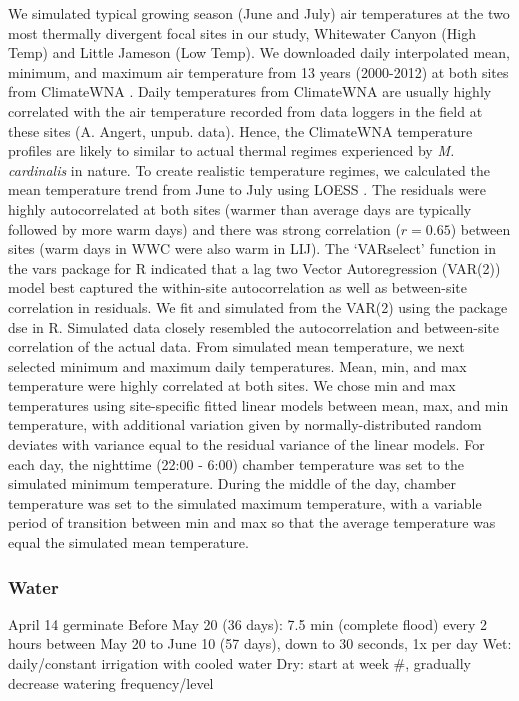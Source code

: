 \documentclass[11pt, oneside]{article}\usepackage[]{graphicx}\usepackage[]{color}
\newcommand{\pkg}[1]{{\fontseries{b}\selectfont #1}}
\begin{document}
We simulated typical growing season (June and July) air temperatures at the two most thermally divergent focal sites in our study, Whitewater Canyon (High Temp) and Little Jameson (Low Temp). We downloaded daily interpolated mean, minimum, and maximum air temperature from 13 years (2000-2012) at both sites from ClimateWNA \citep{Wang_etal_2012}. Daily temperatures from ClimateWNA are usually highly correlated with the air temperature recorded from data loggers in the field at these sites (A. Angert, unpub. data). Hence, the ClimateWNA temperature profiles are likely to similar to actual thermal regimes experienced by \textit{M. cardinalis} in nature. To create realistic temperature regimes, we calculated the mean temperature trend from June to July using LOESS \citep{Cleveland_etal_1992}. The residuals were highly autocorrelated at both sites (warmer than average days are typically followed by more warm days) and there was strong correlation ($r = 0.65$) between sites (warm days in WWC were also warm in LIJ). The `VARselect' function in the \pkg{vars} package for R \citep{Pfaff_2008} indicated that a lag two Vector Autoregression (VAR(2)) model best captured the within-site autocorrelation as well as between-site correlation in residuals. We fit and simulated from the VAR(2) using the package \pkg{dse} \citep{Gilbert_2014} in R. Simulated data closely resembled the autocorrelation and between-site correlation of the actual data. From simulated mean temperature, we next selected minimum and maximum daily temperatures. Mean, min, and max temperature were highly correlated at both sites. We chose min and max temperatures using site-specific fitted linear models between mean, max, and min temperature, with additional variation given by normally-distributed random deviates with variance equal to the residual variance of the linear models. For each day, the nighttime (22:00 - 6:00) chamber temperature was set to the simulated minimum temperature. During the middle of the day, chamber temperature was set to the simulated maximum temperature, with a variable period of transition between min and max so that the average temperature was equal the simulated mean temperature.

\subsubsection*{Water}

      April 14 germinate
      Before May 20 (36 days): 7.5 min (complete flood) every 2 hours
      between May 20 to June 10 (57 days), down to 30 seconds, 1x per day
			Wet: daily/constant irrigation with cooled water
			Dry: start at week \#, gradually decrease watering frequency/level
\end{document}
